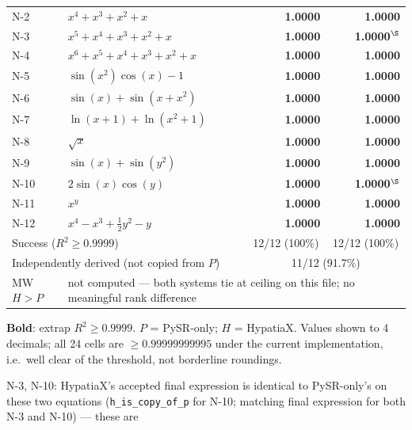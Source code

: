 \documentclass[twoside,11pt]{article}
\newcommand{\Rsq}{R^{2}}
\begin{document}
\begin{table}[h]
\begin{threeparttable}
\begin{tabular}{llrr}
N-2  & $x^4 + x^3 + x^2 + x$                         & \textbf{1.0000} & \textbf{1.0000} \\
N-3  & $x^5 + x^4 + x^3 + x^2 + x$                   & \textbf{1.0000} & \textbf{1.0000}$^\S$ \\
N-4  & $x^6 + x^5 + x^4 + x^3 + x^2 + x$              & \textbf{1.0000} & \textbf{1.0000} \\
N-5  & $\sin(x^2)\cos(x)-1$                          & \textbf{1.0000} & \textbf{1.0000} \\
N-6  & $\sin(x)+\sin(x+x^2)$                         & \textbf{1.0000} & \textbf{1.0000} \\
N-7  & $\ln(x+1)+\ln(x^2+1)$                         & \textbf{1.0000} & \textbf{1.0000} \\
N-8  & $\sqrt{x}$                                    & \textbf{1.0000} & \textbf{1.0000} \\
N-9  & $\sin(x)+\sin(y^2)$                           & \textbf{1.0000} & \textbf{1.0000} \\
N-10 & $2\sin(x)\cos(y)$                             & \textbf{1.0000} & \textbf{1.0000}$^\S$ \\
N-11 & $x^y$                                         & \textbf{1.0000} & \textbf{1.0000} \\
N-12 & $x^4 - x^3 + \tfrac{1}{2}y^2 - y$              & \textbf{1.0000} & \textbf{1.0000} \\
\midrule
\multicolumn{2}{l}{Success ($\Rsq\ge0.9999$)}
  & \multicolumn{1}{c}{12/12 (100\%)}
  & \multicolumn{1}{c}{12/12 (100\%)} \\
\multicolumn{2}{l}{Independently derived (not copied from $P$)}
  & \multicolumn{2}{c}{11/12 (91.7\%)} \\
MW $H>P$   & \multicolumn{3}{l}{not computed --- both systems tie at ceiling on this file; no meaningful rank difference} \\
\bottomrule
\end{tabular}
\begin{tablenotes}\small
  \item \textbf{Bold}: extrap $\Rsq \ge 0.9999$. $P$ = PySR-only; $H$ = HypatiaX.
    Values shown to 4 decimals; all 24 cells are $\ge 0.99999999995$ under
    the current implementation, i.e.\ well clear of the threshold, not
    borderline roundings.
  \item[$\S$] N-3, N-10: HypatiaX's accepted final expression is identical
    to PySR-only's on these two equations (\texttt{h\_is\_copy\_of\_p} for
    N-10; matching final expression for both N-3 and N-10) --- these are

\end{tablenotes}
\end{threeparttable}
\end{table}
\end{document}
